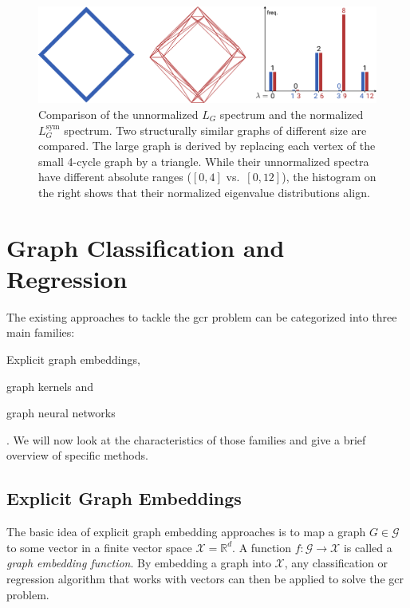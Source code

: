 \begin{figure}[ht]
	\centering
	\includegraphics[width=\linewidth]{gfx/related-work/spectral-normalization.pdf}
	\caption[Comparison of the unnormalized $L_G$ spectrum and the normalized $L^{\text{sym}}_G$ spectrum.]{
		Comparison of the unnormalized $L_G$ spectrum and the normalized $L^{\text{sym}}_G$ spectrum.
		Two structurally similar graphs of different size are compared.
		The \textcolor{t_red}{large graph} is derived by replacing each vertex of the \textcolor{t_blue}{small 4-cycle graph} by a triangle.
		While their unnormalized spectra have different absolute ranges (\textcolor{t_blue}{$[0, 4]$} vs.\ \textcolor{t_red}{$[0, 12]$}), the histogram on the right shows that their normalized eigenvalue distributions align.
	}\label{fig:related:spectral-normalization}
\end{figure}

\section{Graph Classification and Regression}%
\label{sec:related:gcr}

The existing approaches to tackle the \ac{gcr} problem can be categorized into three main families:
\begin{enumerate*}
	\item Explicit graph embeddings,
	\item graph kernels and
	\item graph neural networks
\end{enumerate*}.
We will now look at the characteristics of those families and give a brief overview of specific methods.

\subsection{Explicit Graph Embeddings}%
\label{sec:related:gcr:embed}

The basic idea of explicit graph embedding approaches is to map a graph $G \in \mathcal{G}$ to some vector in a finite vector space $\mathcal{X} = \mathbb{R}^d$.
A function $f: \mathcal{G} \to \mathcal{X}$ is called a \textit{graph embedding function}.
By embedding a graph into $\mathcal{X}$, any classification or regression algorithm that works with vectors can then be applied to solve the \ac{gcr} problem.

